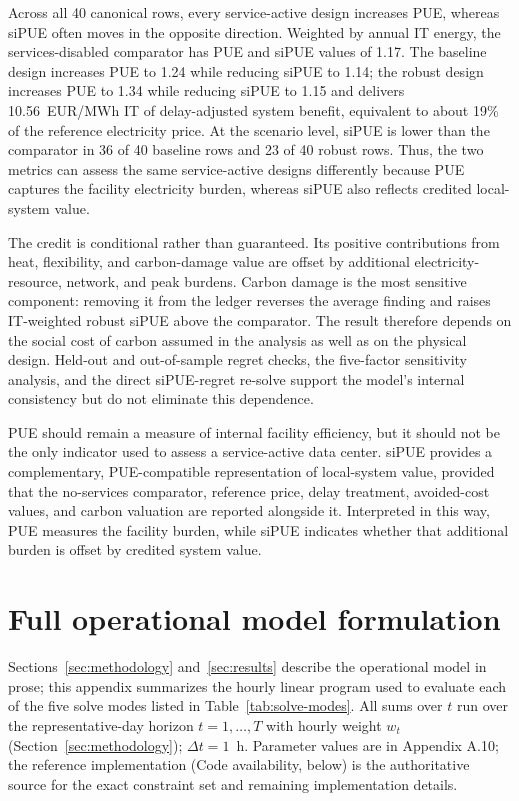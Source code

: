 \documentclass[preprint,12pt]{elsarticle}
\begin{document}
Across all 40 canonical rows, every service-active design increases PUE, whereas siPUE often moves in the opposite direction. Weighted by annual IT energy, the services-disabled comparator has PUE and siPUE values of 1.17. The baseline design increases PUE to 1.24 while reducing siPUE to 1.14; the robust design increases PUE to 1.34 while reducing siPUE to 1.15 and delivers 10.56~EUR/MWh IT of delay-adjusted system benefit, equivalent to about 19\% of the reference electricity price. At the scenario level, siPUE is lower than the comparator in 36 of 40 baseline rows and 23 of 40 robust rows. Thus, the two metrics can assess the same service-active designs differently because PUE captures the facility electricity burden, whereas siPUE also reflects credited local-system value.

The credit is conditional rather than guaranteed. Its positive contributions from heat, flexibility, and carbon-damage value are offset by additional electricity-resource, network, and peak burdens. Carbon damage is the most sensitive component: removing it from the ledger reverses the average finding and raises IT-weighted robust siPUE above the comparator. The result therefore depends on the social cost of carbon assumed in the analysis as well as on the physical design. Held-out and out-of-sample regret checks, the five-factor sensitivity analysis, and the direct siPUE-regret re-solve support the model's internal consistency but do not eliminate this dependence.

PUE should remain a measure of internal facility efficiency, but it should not be the only indicator used to assess a service-active data center. siPUE provides a complementary, PUE-compatible representation of local-system value, provided that the no-services comparator, reference price, delay treatment, avoided-cost values, and carbon valuation are reported alongside it. Interpreted in this way, PUE measures the facility burden, while siPUE indicates whether that additional burden is offset by credited system value.

\appendix
\section{Full operational model formulation}
\label{app:model}

Sections~\ref{sec:methodology} and~\ref{sec:results} describe the operational model in prose; this appendix summarizes the hourly linear program used to evaluate each of the five solve modes listed in Table~\ref{tab:solve-modes}. All sums over $t$ run over the representative-day horizon $t=1,\dots,T$ with hourly weight $w_t$ (Section~\ref{sec:methodology}); $\Delta t=1$~h. Parameter values are in Appendix A.10; the reference implementation (Code availability, below) is the authoritative source for the exact constraint set and remaining implementation details.
\end{document}
